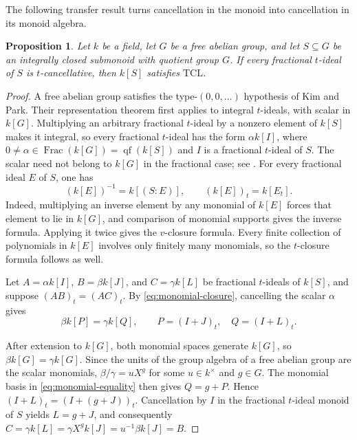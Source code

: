 \documentclass[11pt]{amsart}
\newtheorem{proposition}[proposition]{Proposition}
\theoremstyle{definition}
\theoremstyle{remark}
\newcommand{\TCL}{\mathrm{TCL}}
\begin{document}
The following transfer result turns cancellation in the monoid into
cancellation in its monoid algebra.

\begin{proposition}\label{prop:transfer}
Let $k$ be a field, let $G$ be a free abelian group, and let $S\subseteq G$
be an integrally closed submonoid with quotient group $G$.  If every
fractional $t$-ideal of $S$ is $t$-cancellative, then $k[S]$ satisfies
$\TCL$.
\end{proposition}

\begin{proof}
A free abelian group satisfies the type-$(0,0,\ldots)$ hypothesis of
Kim and Park.  Their representation theorem first applies to integral
$t$-ideals, with scalar in $k[G]$.  Multiplying an arbitrary fractional
$t$-ideal by a nonzero element of $k[S]$ makes it integral, so every
fractional $t$-ideal has the form $\alpha k[I]$, where
$0\ne\alpha\in\operatorname{Frac}(k[G])=\operatorname{qf}(k[S])$ and $I$
is a fractional $t$-ideal of $S$.  The scalar need not belong to $k[G]$ in
the fractional case; see \cite[Lemmas~2.1 and~2.4]{KimPark}.
For every fractional ideal $E$ of $S$, one has
\begin{equation}\label{eq:monomial-closure}
 (k[E])^{-1}=k[(S:E)],\qquad (k[E])_t=k[E_t].
\end{equation}
Indeed, multiplying an inverse element by any monomial of $k[E]$ forces
that element to lie in $k[G]$, and comparison of monomial supports gives
the inverse formula.  Applying it twice gives the $v$-closure formula.
Every finite collection of polynomials in $k[E]$ involves only finitely
many monomials, so the $t$-closure formula follows as well.

Let $A=\alpha k[I]$, $B=\beta k[J]$, and $C=\gamma k[L]$ be fractional
$t$-ideals of $k[S]$, and suppose $(AB)_t=(AC)_t$.  By
\eqref{eq:monomial-closure}, cancelling the scalar $\alpha$ gives
\begin{equation}\label{eq:monomial-equality}
 \beta k[P]=\gamma k[Q],
 \qquad P=(I+J)_t,\quad Q=(I+L)_t.
\end{equation}

After extension to $k[G]$, both monomial spaces generate $k[G]$, so
$\beta k[G]=\gamma k[G]$.  Since the units of the group algebra of a free
abelian group are the scalar monomials, $\beta/\gamma=uX^g$ for some
$u\in k^\times$ and $g\in G$.  The monomial basis in
\eqref{eq:monomial-equality} then gives $Q=g+P$.  Hence
$(I+L)_t=(I+(g+J))_t$.  Cancellation by $I$ in the fractional $t$-ideal
monoid of $S$ yields $L=g+J$, and consequently
$C=\gamma k[L]=\gamma X^g k[J]=u^{-1}\beta k[J]=B$.
\end{proof}
\end{document}
